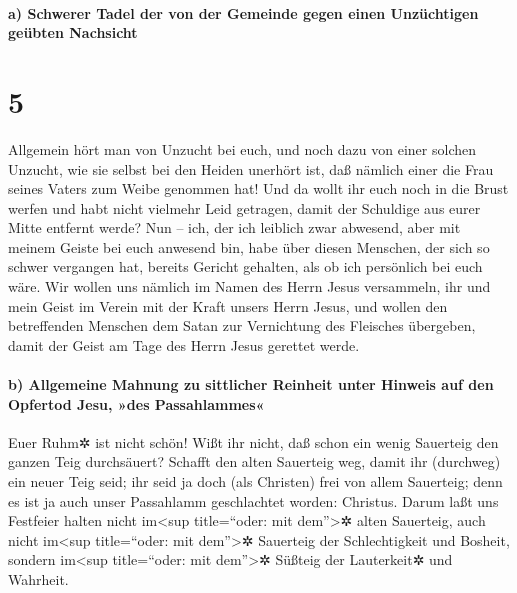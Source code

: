 \hypertarget{a-schwerer-tadel-der-von-der-gemeinde-gegen-einen-unzuxfcchtigen-geuxfcbten-nachsicht}{%
\paragraph{a) Schwerer Tadel der von der Gemeinde gegen einen
Unzüchtigen geübten
Nachsicht}\label{a-schwerer-tadel-der-von-der-gemeinde-gegen-einen-unzuxfcchtigen-geuxfcbten-nachsicht}}

\hypertarget{section-4}{%
\section{5}\label{section-4}}

 Allgemein hört man von Unzucht bei euch, und noch dazu
von einer solchen Unzucht, wie sie selbst bei den Heiden unerhört ist,
daß nämlich einer die Frau seines Vaters zum Weibe genommen hat!
 Und da wollt ihr euch noch in die Brust werfen und habt
nicht vielmehr Leid getragen, damit der Schuldige aus eurer Mitte
entfernt werde?  Nun -- ich, der ich leiblich zwar
abwesend, aber mit meinem Geiste bei euch anwesend bin, habe über diesen
Menschen, der sich so schwer vergangen hat, bereits Gericht gehalten,
als ob ich persönlich bei euch wäre.  Wir wollen uns
nämlich im Namen des Herrn Jesus versammeln, ihr und mein Geist im
Verein mit der Kraft unsers Herrn Jesus,  und wollen den
betreffenden Menschen dem Satan zur Vernichtung des Fleisches übergeben,
damit der Geist am Tage des Herrn Jesus gerettet werde.

\hypertarget{b-allgemeine-mahnung-zu-sittlicher-reinheit-unter-hinweis-auf-den-opfertod-jesu-des-passahlammes}{%
\paragraph{b) Allgemeine Mahnung zu sittlicher Reinheit unter Hinweis
auf den Opfertod Jesu, »des
Passahlammes«}\label{b-allgemeine-mahnung-zu-sittlicher-reinheit-unter-hinweis-auf-den-opfertod-jesu-des-passahlammes}}

 Euer Ruhm✲ ist nicht schön! Wißt ihr nicht, daß schon ein
wenig Sauerteig den ganzen Teig durchsäuert?  Schafft den
alten Sauerteig weg, damit ihr (durchweg) ein neuer Teig seid; ihr seid
ja doch (als Christen) frei von allem Sauerteig; denn es ist ja auch
unser Passahlamm geschlachtet worden: Christus.  Darum
laßt uns Festfeier halten nicht im\textless sup title=``oder: mit
dem''\textgreater✲ alten Sauerteig, auch nicht im\textless sup
title=``oder: mit dem''\textgreater✲ Sauerteig der Schlechtigkeit und
Bosheit, sondern im\textless sup title=``oder: mit dem''\textgreater✲
Süßteig der Lauterkeit✲ und Wahrheit.

